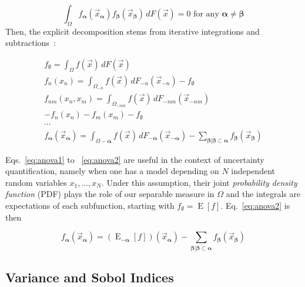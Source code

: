 \documentclass[review, twocolumn]{svjour3}          %
\begin{document}
\begin{equation}
\int_{\Omega} f_{\pmb{\alpha}}(\vec{x}_{\pmb{\alpha}}) f_{\pmb{\beta}}(\vec{x}_{\pmb{\beta}}) \, dF(\vec{x}) = 0 \mbox{ for any } \pmb{\alpha} \ne \pmb{\beta}
\end{equation}
Then, the explicit decomposition stems from iterative integrations and subtractions~\cite{Sobol:90}:

\begin{equation}
\label{eq:anova2}
\begin{split}
f_{\emptyset} = \int_{\Omega} f(\vec{x}) \, dF(\vec{x}) \\
f_n(x_n) = \int_{\Omega_{-n}} f(\vec{x}) \, dF_{-n}(\vec{x}_{-n}) - f_{\emptyset} \\
f_{nm}(x_n, x_m) = \int_{\Omega_{-nm}} f(\vec{x}) \, dF_{-nm}(\vec{x}_{-nm}) \\ - f_n(x_n) - f_m(x_m) - f_{\emptyset} \\
\cdots \\
f_{\pmb{\alpha}}(\vec{x}_{\pmb{\alpha}}) = \int_{\Omega-{\pmb{\alpha}}} f(\vec{x}) \, dF_{-\pmb{\alpha}}(\vec{x}_{-\pmb{\alpha}}) - \sum_{\pmb{\beta} | \pmb{\beta} \subset \pmb{\alpha}} f_{\pmb{\beta}}(\vec{x}_{\pmb{\beta}})
\end{split}
\end{equation}

Eqs.~\ref{eq:anova1} to ~\ref{eq:anova2} are useful in the context of uncertainty quantification, namely when one has a model depending on $N$ independent random variables $x_1, ..., x_N$. Under this assumption, their joint \emph{probability density function} (PDF) plays the role of our separable measure in $\Omega$ and the integrals are expectations of each subfunction, starting with $f_{\emptyset} = \operatorname{E}[f]$. Eq.~\ref{eq:anova2} is then

\begin{equation} \label{eq:expected_values}
f_{\pmb{\alpha}}(\vec{x}_{\pmb{\alpha}}) = (\operatorname{E}_{-\pmb{\alpha}} [f])(\vec{x}_{\pmb{\alpha}}) - \sum_{\pmb{\beta} | \pmb{\beta} \subset \pmb{\alpha}} f_{\pmb{\beta}}(\vec{x}_{\pmb{\beta}})
\end{equation}

\subsection{Variance and Sobol Indices} \label{sec:variance_and_sobol}
\end{document}
